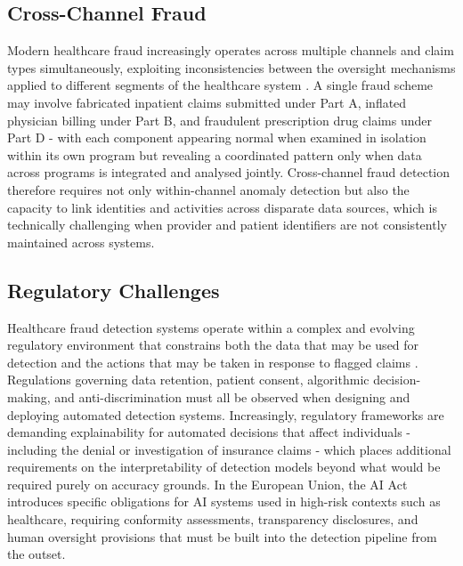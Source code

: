\subsection{Cross-Channel Fraud}

Modern healthcare fraud increasingly operates across multiple channels and claim types simultaneously, exploiting inconsistencies between the oversight mechanisms applied to different segments of the healthcare system \cite{kumar2011}. A single fraud scheme may involve fabricated inpatient claims submitted under Part A, inflated physician billing under Part B, and fraudulent prescription drug claims under Part D - with each component appearing normal when examined in isolation within its own program but revealing a coordinated pattern only when data across programs is integrated and analysed jointly. Cross-channel fraud detection therefore requires not only within-channel anomaly detection but also the capacity to link identities and activities across disparate data sources, which is technically challenging when provider and patient identifiers are not consistently maintained across systems.

\subsection{Regulatory Challenges}

Healthcare fraud detection systems operate within a complex and evolving regulatory environment that constrains both the data that may be used for detection and the actions that may be taken in response to flagged claims \cite{dutt2020}. Regulations governing data retention, patient consent, algorithmic decision-making, and anti-discrimination must all be observed when designing and deploying automated detection systems. Increasingly, regulatory frameworks are demanding explainability for automated decisions that affect individuals - including the denial or investigation of insurance claims - which places additional requirements on the interpretability of detection models beyond what would be required purely on accuracy grounds. In the European Union, the AI Act introduces specific obligations for AI systems used in high-risk contexts such as healthcare, requiring conformity assessments, transparency disclosures, and human oversight provisions that must be built into the detection pipeline from the outset.

